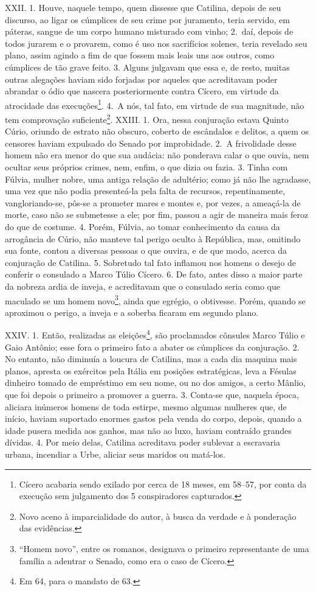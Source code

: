 XXII. 1. Houve, naquele tempo, quem dissesse que Catilina, depois de seu
discurso, ao ligar os cúmplices de seu crime por juramento, teria servido, em
páteras, sangue de um corpo humano misturado com vinho; 2.~daí, depois de todos
jurarem e o provarem, como é uso nos sacrifícios solenes, teria revelado
seu plano, assim agindo a fim de que fossem mais leais uns aos outros, como
cúmplices de tão grave feito. 3. Alguns julgavam que essa e, de resto, muitas
outras alegações haviam sido forjadas por aqueles que acreditavam poder
abrandar o ódio que nascera posteriormente contra Cícero, em virtude da
atrocidade das execuções\footnote{Cícero acabaria sendo exilado por cerca de 18
meses, em 58--57, por conta da execução sem julgamento dos 5 conspiradores
capturados.}. 4.~A nós, tal fato, em virtude de sua magnitude, não tem
comprovação suficiente\footnote{Novo aceno à imparcialidade do autor, à busca
da verdade e à ponderação das evidências.}.  XXIII. 1. Ora, nessa conjuração
estava Quinto Cúrio, oriundo de estrato não obscuro, coberto de escândalos e
delitos, a quem os censores haviam expulsado do Senado por improbidade. 2.~A
frivolidade desse homem não era menor do que sua audácia: não ponderava calar o
que ouvia, nem ocultar seus próprios crimes, nem, enfim, o que dizia ou fazia.
3. Tinha com Fúlvia, mulher nobre, uma antiga relação de adultério; como já não lhe agradasse, uma vez que não podia presenteá-la pela falta de recursos,
repentinamente, vangloriando-se, pôs-se a prometer mares e montes e, por vezes,
a ameaçá-la de morte, caso não se submetesse a ele; por fim, passou a agir de
maneira mais feroz do que de costume. 4. Porém, Fúlvia, ao tomar conhecimento
da causa da arrogância de Cúrio, não manteve tal perigo oculto à República,
mas, omitindo sua fonte, contou a diversas pessoas o que ouvira, e de que modo,
acerca da conjuração de Catilina. 5. Sobretudo tal fato inflamou nos homens o
desejo de conferir o consulado a Marco Túlio Cícero. 6. De fato, antes disso a
maior parte da nobreza ardia de inveja, e acreditavam que o consulado seria
como que maculado se um homem novo\footnote{``Homem novo'', entre os romanos,
designava o primeiro representante de uma família a adentrar o Senado, como era
o caso de Cícero.}, ainda que egrégio, o obtivesse. Porém, quando se aproximou
o perigo, a inveja e a soberba ficaram em segundo plano.

XXIV. 1. Então, realizadas as eleições\footnote{Em 64, para o mandato de  63.},
são proclamados cônsules Marco Túlio e Gaio Antônio; esse fora o primeiro fato
a abater os cúmplices da conjuração. 2. No entanto, não diminuía a loucura de
Catilina, mas a cada dia maquina mais planos, apresta os exércitos pela Itália
em posições estratégicas, leva a Fésulas dinheiro tomado de empréstimo em seu
nome, ou no dos amigos, a certo Mânlio, que foi depois o primeiro a promover a
guerra. 3. Conta-se que, naquela época, aliciara inúmeros homens de toda
estirpe, mesmo algumas mulheres que, de início, haviam suportado enormes gastos
pela venda do corpo, depois, quando a idade pusera medida aos ganhos, mas não
ao luxo, haviam contraído grandes dívidas. 4. Por meio delas, Catilina
acreditava poder sublevar a escravaria urbana, incendiar a Urbe, aliciar seus
maridos ou matá-los.


